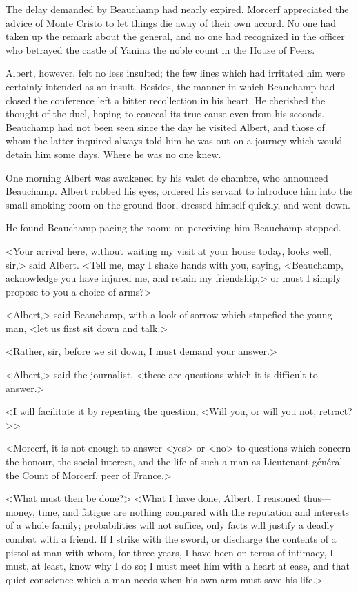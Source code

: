  The delay demanded by Beauchamp had nearly expired. Morcerf appreciated the advice of Monte Cristo to let things die away of their own accord. No one had taken up the remark about the general, and no one had recognized in the officer who betrayed the castle of Yanina the noble count in the House of Peers. 

 Albert, however, felt no less insulted; the few lines which had irritated him were certainly intended as an insult. Besides, the manner in which Beauchamp had closed the conference left a bitter recollection in his heart. He cherished the thought of the duel, hoping to conceal its true cause even from his seconds. Beauchamp had not been seen since the day he visited Albert, and those of whom the latter inquired always told him he was out on a journey which would detain him some days. Where he was no one knew. 

 One morning Albert was awakened by his valet de chambre, who announced Beauchamp. Albert rubbed his eyes, ordered his servant to introduce him into the small smoking-room on the ground floor, dressed himself quickly, and went down. 

 He found Beauchamp pacing the room; on perceiving him Beauchamp stopped. 

 <Your arrival here, without waiting my visit at your house today, looks well, sir,> said Albert. <Tell me, may I shake hands with you, saying, <Beauchamp, acknowledge you have injured me, and retain my friendship,> or must I simply propose to you a choice of arms?> 

 <Albert,> said Beauchamp, with a look of sorrow which stupefied the young man, <let us first sit down and talk.> 

 <Rather, sir, before we sit down, I must demand your answer.> 

 <Albert,> said the journalist, <these are questions which it is difficult to answer.> 

 <I will facilitate it by repeating the question, <Will you, or will you not, retract?>> 

 <Morcerf, it is not enough to answer <yes> or <no> to questions which concern the honour, the social interest, and the life of such a man as Lieutenant-général the Count of Morcerf, peer of France.> 

 <What must then be done?>  <What I have done, Albert. I reasoned thus—money, time, and fatigue are nothing compared with the reputation and interests of a whole family; probabilities will not suffice, only facts will justify a deadly combat with a friend. If I strike with the sword, or discharge the contents of a pistol at man with whom, for three years, I have been on terms of intimacy, I must, at least, know why I do so; I must meet him with a heart at ease, and that quiet conscience which a man needs when his own arm must save his life.> 

